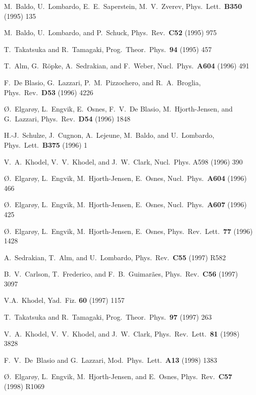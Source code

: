 \begin{thebibliography}{999}
 M.~Baldo, U.~Lombardo, E.~E.~Saperstein, M.~V.~Zverev,
Phys.~Lett.\ {\bf B350} (1995) 135

M.~Baldo, U.~Lombardo, and P.~Schuck, Phys.\ Rev.\ {\bf C52} (1995) 975 

T.~Takatsuka and R.~Tamagaki, Prog.\ Theor.\ Phys.\ {\bf 94} (1995) 457

T.~Alm, G.~R\"opke, A.~Sedrakian, and F.~Weber, Nucl.\ Phys.\ {\bf A604}
(1996) 491

 F.~De Blasio, G.~Lazzari, P.~M.~Pizzochero, and R.~A.~Broglia,
Phys.\ Rev.\ {\bf D53} (1996) 4226

{\O}.~Elgar{\o}y, L.~Engvik, E.~Osnes, F.~V.~De Blasio, M.~Hjorth-Jensen,
and G.~Lazzari, Phys.\ Rev.\ {\bf D54} (1996) 1848

H.-J.~Schulze, J.~Cugnon, A.~Lejeune, M.~Baldo, and U.~Lombardo,
Phys.\ Lett.\ {\bf B375} (1996) 1

 V.~A.~Khodel, V.~V.~Khodel, and J.~W.~Clark, Nucl.~Phys. A598
(1996) 390

{\O}.~Elgar{\o}y, L.~Engvik, M.~Hjorth-Jensen, E.~Osnes, Nucl.\ Phys.\ 
{\bf A604} (1996) 466

{\O}.~Elgar{\o}y, L.~Engvik, M.~Hjorth-Jensen, E.~Osnes,
Nucl.\ Phys.\ {\bf A607} (1996) 425

 {\O}.~Elgar{\o}y, L.~Engvik, M.~Hjorth-Jensen, E.~Osnes,
Phys.\ Rev.\ Lett.\ {\bf 77} (1996) 1428

A.~Sedrakian, T.~Alm, and U.~Lombardo, Phys.\ Rev.\ {\bf C55} (1997) R582

B.~V.~Carlson, T.~Frederico, and F.~B.~Guimar\~aes, Phys.\ Rev.\ {\bf C56}
(1997) 3097 

 V.A.~Khodel, Yad.~Fiz. {\bf 60} (1997) 1157

T.~Takatsuka and R.~Tamagaki, Prog.\ Theor.\ Phys.\ {\bf 97} (1997) 263

 V.~A.~Khodel, V.~V.~Khodel, and J.~W.~Clark, 
Phys.\ Rev.\ Lett.\ {\bf 81} (1998) 3828

F.~V.~De~Blasio and G.~Lazzari, Mod.\ Phys.\ Lett.\ {\bf A13} (1998) 1383

{\O}.~Elgar{\o}y, L.~Engvik, M.~Hjorth-Jensen, and E.~Osnes, 
Phys.\ Rev.\ {\bf C57} (1998) R1069 


\end{thebibliography}

